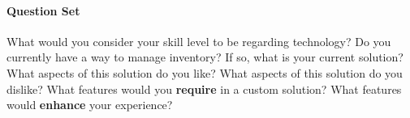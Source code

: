 \documentclass[../../../main.tex]{subfiles}
\begin{document}
\paragraph{Question Set}
\begin{outline}
    \1 What would you consider your skill level to be regarding technology?
    \1 Do you currently have a way to manage inventory?
    \1 If so, what is your current solution?
    \1 What aspects of this solution do you like?
    \1 What aspects of this solution do you dislike?
    \1 What features would you \textbf{require} in a custom solution?
    \1 What features would \textbf{enhance} your experience?
\end{outline}

\begin{comment}
CF
CF "SLT": library

what is the current system?
borrowing cards and date stamps that are manually written in for when books are due back
borrower card for who borrowed which book, stickers placed on books for categories

problems with existing solution
time consuming; cards get lost; stickers fall off
not very quick to see who borrowed what; have to look through all cards


like about the existing solution
primary aged students/children can do it (themselves)

requirements for new solution

scan a barcode / borrower ticket and instantly see what they've borrowed.

cost effective
compatible with existing hardware/software
works on ipa
ability to renew
notified when books are overdue
statistics (book numbers) by genre/author/category

enhancements for new solution
colored stickers for categories
ability to charge parents (make an invoice?)

is there a specific way you would like the system to be organised?
yes, we are a library so by preset genres and categories

do you have any questions of your own?
what's the timeframe for this being completed - March.

fake pupil: Ella (no surname)
year 6 "head librarian" age 10-**11** (y6)

problems with the current system
"so old fashioned, should be able to scan using my iPad! Then it could be pupil-led."

benefits
can see who borrowed the book I want and nag them to return it so I can read it!
when I forget which book I've borrowed the teacher can easily find which books I've lost

requirements
iPads; fast (can be done in break times - borrow/renew)




fake teacher
equipment for science lab/art room/ etc


can say helping a junior school.


\end{comment}
\end{document}
